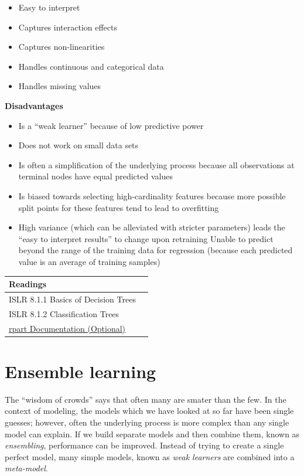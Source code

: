 \documentclass[openany]{book}
\providecommand{\tightlist}{%
  \setlength{\itemsep}{0pt}\setlength{\parskip}{0pt}}
\begin{document}
\begin{itemize}
\tightlist
\item
  Easy to interpret
\item
  Captures interaction effects
\item
  Captures non-linearities
\item
  Handles continuous and categorical data
\item
  Handles missing values
\end{itemize}

\textbf{Disadvantages}

\begin{itemize}
\tightlist
\item
  Is a ``weak learner'' because of low predictive power
\item
  Does not work on small data sets
\item
  Is often a simplification of the underlying process because all observations at terminal nodes have equal predicted values
\item
  Is biased towards selecting high-cardinality features because more possible split points for these features tend to lead to overfitting
\item
  High variance (which can be alleviated with stricter parameters) leads the ``easy to interpret results'' to change upon retraining
  Unable to predict beyond the range of the training data for regression (because each predicted value is an average of training samples)
\end{itemize}

\begin{longtable}[]{@{}ll@{}}
\toprule
Readings &\tabularnewline
\midrule
\endhead
ISLR 8.1.1 Basics of Decision Trees &\tabularnewline
ISLR 8.1.2 Classification Trees &\tabularnewline
\href{https://cran.r-project.org/web/packages/rpart/vignettes/longintro.pdf}{rpart Documentation (Optional)} &\tabularnewline
\bottomrule
\end{longtable}

\hypertarget{ensemble-learning}{%
\section{Ensemble learning}\label{ensemble-learning}}

The ``wisdom of crowds'' says that often many are smater than the few. In the context of modeling, the models which we have looked at so far have been single guesses; however, often the underlying process is more complex than any single model can explain. If we build separate models and then combine them, known as \emph{ensembling}, performance can be improved. Instead of trying to create a single perfect model, many simple models, known as \emph{weak learners} are combined into a \emph{meta-model}.
\end{document}
